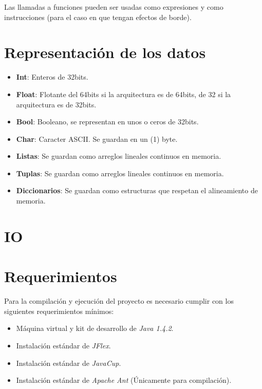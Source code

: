 \documentclass[12pt, spanish]{report}
\begin{document}
Las llamadas a funciones pueden ser usadas como expresiones y como
instrucciones (para el caso en que tengan efectos de borde).

\chapter{Representaci\'on de los datos}
\label{chap:impl}
\begin{itemize}
\item \textbf{Int}: Enteros de 32bits.
\item \textbf{Float}: Flotante del 64bits si la arquitectura es de
                      64bits, de 32 si la arquitectura es de 32bits.
\item \textbf{Bool}: Booleano, se representan en unos o ceros de 32bits.
\item \textbf{Char}: Caracter ASCII. Se guardan en un (1) byte.
\item \textbf{Listas}: Se guardan como arreglos lineales continuos en memoria.
\item \textbf{Tuplas}: Se guardan como arreglos lineales continuos en memoria.
\item \textbf{Diccionarios}: Se guardan como estructuras que respetan el alineamiento
                       de memoria.
\end{itemize}

\chapter{IO}
\label{chap:io}

\chapter{Requerimientos}
\label{sec:requ}

Para la compilaci\'on y ejecuci\'on del proyecto es necesario cumplir con
los siguientes requerimientos m\'inimos:

\begin{itemize}
\item M\'aquina virtual y kit de desarrollo de \emph{Java 1.4.2}.
\item Instalaci\'on est\'andar de \emph{JFlex}.
\item Instalaci\'on est\'andar de \emph{JavaCup}.
\item Instalaci\'on est\'andar de \emph{Apache Ant} (\'Unicamente para
  compilaci\'on).
\end{itemize}
\end{document}
